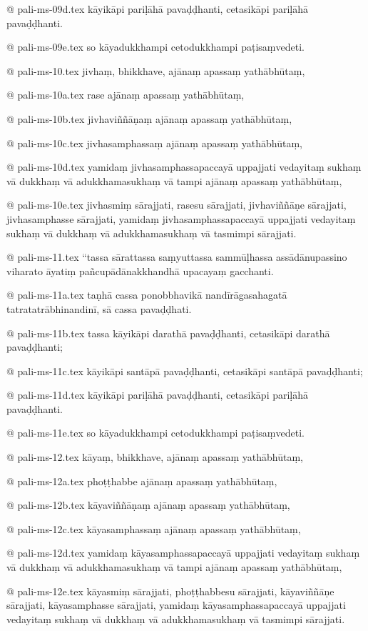 @ pali-ms-09d.tex
kāyikāpi pariḷāhā pavaḍḍhanti, cetasikāpi pariḷāhā pavaḍḍhanti.

@ pali-ms-09e.tex
so kāyadukkhampi cetodukkhampi paṭisaṃvedeti.

@ pali-ms-10.tex
jivhaṃ, bhikkhave, ajānaṃ apassaṃ yathābhūtaṃ,

@ pali-ms-10a.tex
rase ajānaṃ apassaṃ yathābhūtaṃ,

@ pali-ms-10b.tex
jivhaviññāṇaṃ ajānaṃ apassaṃ yathābhūtaṃ,

@ pali-ms-10c.tex
jivhasamphassaṃ ajānaṃ apassaṃ yathābhūtaṃ,

@ pali-ms-10d.tex
yamidaṃ jivhasamphassapaccayā uppajjati vedayitaṃ sukhaṃ vā dukkhaṃ vā adukkhamasukhaṃ vā tampi ajānaṃ apassaṃ yathābhūtaṃ,

@ pali-ms-10e.tex
jivhasmiṃ sārajjati, rasesu sārajjati, jivhaviññāṇe sārajjati, jivhasamphasse sārajjati, yamidaṃ jivhasamphassapaccayā uppajjati vedayitaṃ sukhaṃ vā dukkhaṃ vā adukkhamasukhaṃ vā tasmimpi sārajjati.

@ pali-ms-11.tex
“tassa sārattassa saṃyuttassa sammūḷhassa assādānupassino viharato āyatiṃ pañcupādānakkhandhā upacayaṃ gacchanti.

@ pali-ms-11a.tex
taṇhā cassa ponobbhavikā nandīrāgasahagatā tatratatrābhinandinī, sā cassa pavaḍḍhati.

@ pali-ms-11b.tex
tassa kāyikāpi darathā pavaḍḍhanti, cetasikāpi darathā pavaḍḍhanti;

@ pali-ms-11c.tex
kāyikāpi santāpā pavaḍḍhanti, cetasikāpi santāpā pavaḍḍhanti;

@ pali-ms-11d.tex
kāyikāpi pariḷāhā pavaḍḍhanti, cetasikāpi pariḷāhā pavaḍḍhanti.

@ pali-ms-11e.tex
so kāyadukkhampi cetodukkhampi paṭisaṃvedeti.

@ pali-ms-12.tex
kāyaṃ, bhikkhave, ajānaṃ apassaṃ yathābhūtaṃ,

@ pali-ms-12a.tex
phoṭṭhabbe ajānaṃ apassaṃ yathābhūtaṃ,

@ pali-ms-12b.tex
kāyaviññāṇaṃ ajānaṃ apassaṃ yathābhūtaṃ,

@ pali-ms-12c.tex
kāyasamphassaṃ ajānaṃ apassaṃ yathābhūtaṃ,

@ pali-ms-12d.tex
yamidaṃ kāyasamphassapaccayā uppajjati vedayitaṃ sukhaṃ vā dukkhaṃ vā adukkhamasukhaṃ vā tampi ajānaṃ apassaṃ yathābhūtaṃ,

@ pali-ms-12e.tex
kāyasmiṃ sārajjati, phoṭṭhabbesu sārajjati, kāyaviññāṇe sārajjati, kāyasamphasse sārajjati, yamidaṃ kāyasamphassapaccayā uppajjati vedayitaṃ sukhaṃ vā dukkhaṃ vā adukkhamasukhaṃ vā tasmimpi sārajjati.

